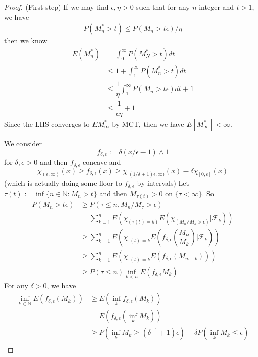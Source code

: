 \begin{proof}
    (First step) If we may find $\epsilon, \eta > 0$ such that for any $n$ integer and $t>1$, we have
    \[
    P(M_n^* > t) \leq P(M_n > t\epsilon)/\eta
    \]
    then we know
    \[
    \begin{aligned}
        E(M_n^*) &= \int_0^{\infty} P(M_N^* >t) dt \\
        &\leq 1 + \int_1^{\infty} P(M_n^*>t) dt \\
        &\leq \dfrac{1}{\eta}\int_1^{\infty}P(M_n>t\epsilon)dt + 1 \\
        &\leq \dfrac{1}{\epsilon\eta} + 1
    \end{aligned}
    \]
    Since the LHS converges to $EM_{\infty}^*$ by MCT, then we have $E[M^*_{\infty}] < \infty$.\par
    We consider
    \[
    f_{\delta,\epsilon} := \delta(x/\epsilon - 1)\wedge 1
    \]
    for $\delta, \epsilon > 0$ and then $f_{\delta,\epsilon}$ concave and
    \[
    \chi_{(\epsilon,\infty)}(x)\geq f_{\delta,\epsilon}(x) \geq \chi_{[(1/\delta + 1)\epsilon,\infty)}(x) - \delta\chi_{[0,\epsilon]} (x)
    \]
    (which is actually doing some floor to $f_{\delta,\epsilon}$ by intervals) Let $\tau(t):=\inf\{n\in \mathbb{N}: M_n > t\}$ and then $M_{\tau(t)} > 0$ on $\{\tau<\infty\}$. So
    \[
    \begin{aligned}
        P(M_n > t\epsilon) &\geq P(\tau \leq n, M_n/M_{\tau} > \epsilon) \\
        &= \sum\limits_{k=1}^n E\left(\chi_{(\tau(t) = k)}E(\chi_{(M_n/M_k>\epsilon)}|\mathcal{F}_k)\right) \\
        &\geq \sum\limits_{k=1}^n E\left(\chi_{\tau(t) = k}E\left(f_{\delta,\epsilon}\left(\dfrac{M_n}{M_k}\right)|\mathcal{F}_k\right)\right) \\
        &\geq \sum\limits_{k=1}^n E\left(\chi_{\tau(t) = k}E\left(f_{\delta,\epsilon}(M_{n-k})\right)\right) \\
        &\geq P(\tau\leq n)\inf_{k< n} E(f_{\delta,\epsilon} M_k)
    \end{aligned}
    \]
    For any $\delta > 0$, we have
    \[
    \begin{aligned}
        \inf_{k\in\mathbb{N}}E(f_{\delta,\epsilon}(M_k)) &\geq E(\inf_k f_{
       \delta,\epsilon}(M_k)) \\
        &=E(f_{
       \delta,\epsilon}(\inf_k M_k)) \\
        &\geq P(\inf_k M_k\geq (\delta^{-1}+1)\epsilon) - \delta P(\inf_k M_k \leq \epsilon) \\

\end{aligned}\]
\end{proof}
